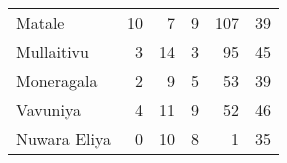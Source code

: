 \begin{tabular}{lrrrrr}
Matale       &          10 &           7 &            9 &              107 &          39 \\
Mullaitivu   &           3 &          14 &            3 &               95 &          45 \\
Moneragala   &           2 &           9 &            5 &               53 &          39 \\
Vavuniya     &           4 &          11 &            9 &               52 &          46 \\
Nuwara Eliya &           0 &          10 &            8 &                1 &          35 \\
\bottomrule
\end{tabular}
